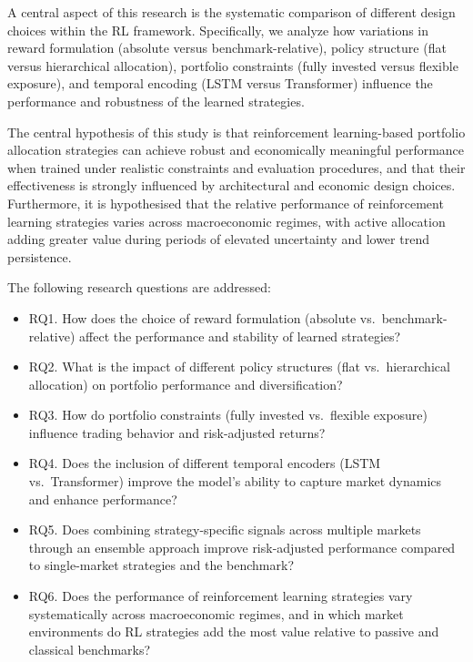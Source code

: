 \documentclass[]{elsarticle}
\begin{document}
A central aspect of this research is the systematic comparison of different design choices within the RL framework. Specifically, we analyze how variations in reward formulation (absolute versus benchmark-relative), policy structure (flat versus hierarchical allocation), portfolio constraints (fully invested versus flexible exposure), and temporal encoding (LSTM versus Transformer) influence the performance and robustness of the learned strategies.

The central hypothesis of this study is that reinforcement learning-based portfolio allocation strategies can achieve robust and economically meaningful performance when trained under realistic constraints and evaluation procedures, and that their effectiveness is strongly influenced by architectural and economic design choices. Furthermore, it is hypothesised that the relative performance of reinforcement learning strategies varies across macroeconomic regimes, with active allocation adding greater value during periods of elevated uncertainty and lower trend persistence.

The following research questions are addressed:

\begin{itemize}
\item RQ1. How does the choice of reward formulation (absolute vs.\ benchmark-relative) affect the performance and stability of learned strategies?
\item RQ2. What is the impact of different policy structures (flat vs.\ hierarchical allocation) on portfolio performance and diversification?
\item RQ3. How do portfolio constraints (fully invested vs.\ flexible exposure) influence trading behavior and risk-adjusted returns?
\item RQ4. Does the inclusion of different temporal encoders (LSTM vs.\ Transformer) improve the model’s ability to capture market dynamics and enhance performance?
\item RQ5. Does combining strategy-specific signals across multiple markets through an ensemble approach improve risk-adjusted performance compared to single-market strategies and the benchmark?
\item RQ6. Does the performance of reinforcement learning strategies vary systematically across macroeconomic regimes, and in which market environments do RL strategies add the most value relative to passive and classical benchmarks?
\end{itemize}
\end{document}
